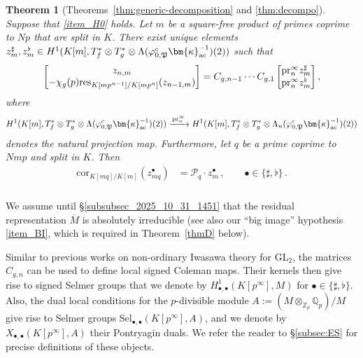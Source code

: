 \documentclass{amsart}
\numberwithin{equation}{section}
\newtheorem{lthm}{Theorem}
\newcommand{\bb}{\mathbb}
\newcommand{\frk}{\mathfrak}
\newcommand{\pr}{\mathrm{pr}}
\newcommand{\GL}{\mathrm{GL}}
\newcommand{\Sel}{\mathrm{Sel}}
\newcommand{\ac}{\textup{ac}}
\newcommand{\res}{\textup{res}}
\newcommand{\cP}{\mathcal{P}}
\begin{document}
\begin{lthm}[Theorems~\ref{thm:generic-decomposition} and \ref{thm:decompo}]\label{thmC}
     Suppose that \eqref{item_H0}  holds. Let $m$ be a square-free product of primes coprime to $Np$ that are split in $K$. There exist unique elements $z_m^\sharp,z_m^\flat\in H^1(K[m],T_f^\ast\otimes T_g^\ast\otimes \Lambda(\varphi_{0,\frk{P}}^c\bm{\kappa}_{\ac}^{-1})(2))$ such that
     \[
    \begin{bmatrix}
        z_{n,m}\\-\chi_g(p)\res_{K[mp^{n-1}]/K[mp^n]}(z_{n-1,m})
    \end{bmatrix}
    =C_{g,n-1}\cdots C_{g,1}\begin{bmatrix}
        \pr^\infty_n z_m^\sharp\\\pr^\infty_n z_m^\flat
    \end{bmatrix},
    \]
    where  
    $$H^1(K[m],T_f^\ast\otimes T_g^\ast\otimes \Lambda(\varphi_{0,\frk{P}}^c\bm{\kappa}_{\ac}^{-1})(2))\xrightarrow{\,\pr^\infty_n\,} H^1(K[m],T_f^\ast\otimes T_g^\ast\otimes \Lambda_n(\varphi_{0,\frk{P}}^c\bm{\kappa}_{\ac}^{-1})(2))$$ 
    denotes the natural projection map.
    Furthermore,  let $q$ be a prime coprime to $Nmp$ and split in $K$. Then
    \begin{align*}
        \mathrm{cor}_{K[mq]/K[m]}\left(z_{m q}^\bullet\right) &= \cP_q\cdot z_{m}^\bullet\,,\qquad \bullet\in\{\sharp,\flat\}\,.
    \end{align*}
\end{lthm}

\subsubsection{} 
\label{subsubsection_125_2025_11_02}
 We assume until \S\ref{subsubsec_2025_10_31_1451} that the residual representation $\overline{M}$ is absolutely irreducible (see also our ``big image'' hypothesis \eqref{item_BI}, which is required in Theorem~\ref{thmD} below).

Similar to previous works on non-ordinary Iwasawa theory for $\GL_2$, the matrices $C_{g,n}$ can be used to define local signed Coleman maps. Their kernels then give rise to signed Selmer groups that we denote by $H^1_{\bullet,\bullet}(K[p^\infty],M)$ for $\bullet\in \lbrace \sharp,\flat\rbrace$. Also, the dual local conditions for the $p$-divisible module $A:=(M\otimes_{\bb{Z}_p}\bb{Q}_p)/M$ give rise to Selmer groups $\Sel_{\bullet,\bullet}(K[p^\infty],A)$, and we denote by $X_{\bullet,\bullet}(K[p^\infty],A)$ their Pontryagin duals. We refer the reader to \S\ref{subsec:ES} for precise definitions of these objects.
\end{document}
